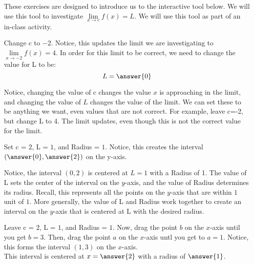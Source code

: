 \documentclass{ximera}
\author{Kevin James}
\begin{document}
   \begin{exercise}
   	These exercises are designed to introduce us to the interactive tool below.  We will use this tool to investigate $ \lim\limits_{x \to c}f(x)=L $.  We will use this tool as part of an in-class activity.
   	\begin{center}
   	   \begin{onlineOnly}
   	   \end{onlineOnly} 
   	\end{center}
    \begin{question}
   	  Change c to $-2$.  Notice, this updates the limit we are investigating to $\lim\limits_{x \to -2}f(x)=4$.  In order for this limit to be correct, we need to change the value for L to be: 
   	  \[
   	      L=\answer{0}
   	  \]
   	  \begin{feedback}
   	  	Notice, changing the value of c changes the value $x$ is approaching in the limit, and changing the value of $L$ changes the value of the limit.  We can set these to be anything we want, even values that are not correct.  For example, leave c=-2, but change L to 4.  The limit updates, even though this is not the correct value for the limit.
   	  \end{feedback}
      \begin{question}
      	Set c = $2$, L = $1$, and Radius = $1$.  Notice, this creates the interval $\left(\answer{0}, \answer{2}\right)$ on the y-axis.
      	\begin{feedback}
      		Notice, the interval $(0,2)$ is centered at $L=1$ with a Radius of 1.  The value of L sets the center of the interval on the $y$-axis, and the value of Radius determines its radius.  Recall, this represents all the points on the $y$-axis that are within $1$ unit of $1$.  More generally, the value of L and Radius work together to create an interval on the $y$-axis that is centered at L with the desired radius.
      	\end{feedback}
        \begin{question}
        	Leave c = $2$, L = $1$, and Radius = $1$.  Now, drag the point $b$ on the $x$-axis until you get $b=3$.  Then, drag the point $a$ on the $x$-axis untl you get to $a=1$.  Notice, this forms the interval $(1,3)$ on the $x$-axis. \\
        	This interval is centered at $x=\answer{2}$ with a radius of $\answer{1}$.
        	\begin{feedback}

\end{feedback}
\end{question}
\end{question}
\end{question}
\end{exercise}
\end{document}
